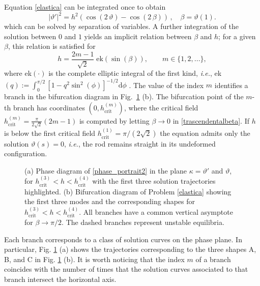 \documentclass[oneside]{article}
\begin{document}
			Equation \eqref{elastica} can be integrated once to obtain 
			\begin{equation}
			|\vartheta'|^2=h^2 \left(\cos(2\,\vartheta)-\cos(2\,\beta)\right)\,,\quad\beta=\vartheta(1).
			\label{FirstIntegral}
			\end{equation}
			which can be solved by separation of variables. A further integration of the solution between $0$ and $1$ yields an implicit relation between $\beta$ and $h$; for a given $\beta$, this relation is satisfied for
			\begin{equation}
			h=\frac{2m-1}{\sqrt{2}}\;\text{ek}(\sin(\beta)),\qquad m\in \lbrace 1,2,...\rbrace,
			\label{trascendentalbeta}
			\end{equation}
			where ek$(\cdot)$ is the complete elliptic integral of the first kind, \textit{i.e.}, ek$(q):=\int_0^{\pi/2}\left[1-q^2\sin^2(\phi)\right]^{-1/2}\text{d}\phi$ \cite{Byrd1971}. The value of the index $m$ identifies a branch in the bifurcation diagram in Fig.~\ref{fig:bifurcation_PhaseDiagram} (b). The bifurcation point of the $m$-th branch has coordinates $(0,h_\text{crit}^{(m)})$, where the critical field $h_\text{crit}^{(m)}=\frac{\pi}{2\sqrt{2}}(2m-1)$ is computed by letting $\beta\to 0$ in \eqref{trascendentalbeta}. If $h$ is below the first critical field $h_\text{crit}^{(1)}=\pi/(2\sqrt{2})$ the equation admits only the solution $\vartheta(s)=0$, \textit{i.e.}, the rod remains straight in its undeformed configuration.
			\begin{figure}[h]
				\begin{center}
					\begin{tiny}
						\def\svgwidth{1\textwidth}
						
					\end{tiny}	
					\caption{(a)  Phase diagram of \eqref{phase_portrait2} in the plane $\kappa=\vartheta'$ and $\vartheta$, for $h_\text{crit}^{(3)}<h<h_\text{crit}^{(4)}$ with the first three solution trajectories highlighted. (b) Bifurcation diagram of Problem \eqref{elastica} showing the first three modes and the corresponding shapes for $h_\text{crit}^{(3)}<h<h_\text{crit}^{(4)}$. All branches have a common vertical asymptote for $\beta\rightarrow\pi/2$. The dashed branches represent unstable equilibria.}
					\label{fig:bifurcation_PhaseDiagram}
				\end{center}
			\end{figure}
			
			Each branch corresponds to a class of solution curves on the phase plane. In particular, Fig. \ref{fig:bifurcation_PhaseDiagram} (a) shows the trajectories corresponding to the three shapes A, B, and C in Fig. \ref{fig:bifurcation_PhaseDiagram} (b). It is worth noticing that the index $m$ of a branch coincides with the number of times that the solution curves associated to that branch intersect the horizontal axis.
			
\end{document}
